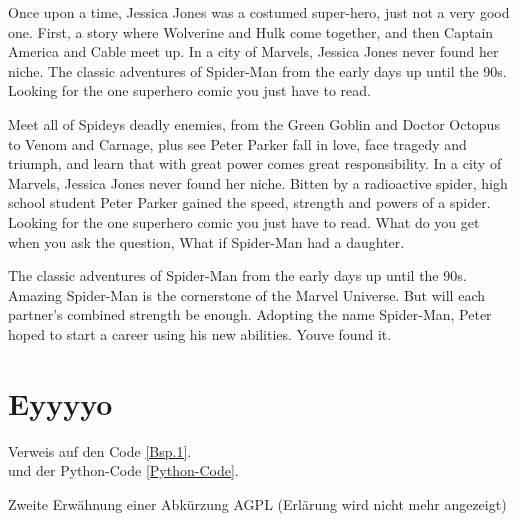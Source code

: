 Once upon a time, Jessica Jones was a costumed super-hero, just not a very good one. First, a story where Wolverine and Hulk come together, and then Captain America and Cable meet up. In a city of Marvels, Jessica Jones never found her niche. The classic adventures of Spider-Man from the early days up until the 90s. Looking for the one superhero comic you just have to read.

Meet all of Spideys deadly enemies, from the Green Goblin and Doctor Octopus to Venom and Carnage, plus see Peter Parker fall in love, face tragedy and triumph, and learn that with great power comes great responsibility. In a city of Marvels, Jessica Jones never found her niche. Bitten by a radioactive spider, high school student Peter Parker gained the speed, strength and powers of a spider. Looking for the one superhero comic you just have to read. What do you get when you ask the question, What if Spider-Man had a daughter.

The classic adventures of Spider-Man from the early days up until the 90s. Amazing Spider-Man is the cornerstone of the Marvel Universe. But will each partner's combined strength be enough. Adopting the name Spider-Man, Peter hoped to start a career using his new abilities. Youve found it.

\section{Eyyyyo}
Verweis auf den Code \autoref{Bsp.1}.\\
und der Python-Code \autoref{Python-Code}.

Zweite Erwähnung einer Abkürzung \gls{AGPL} (Erlärung wird nicht mehr angezeigt)
